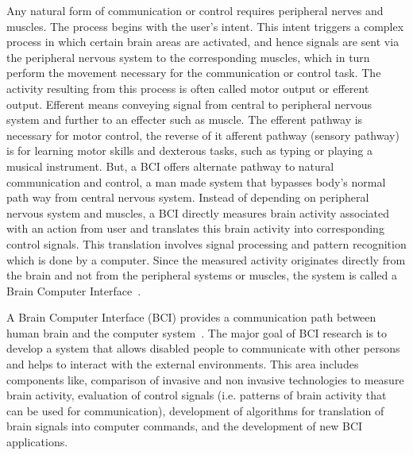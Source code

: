 Any natural form of communication or control requires peripheral nerves and muscles. The process begins with the user's intent. This intent triggers a complex process in which certain brain areas are activated, and hence signals are sent via the peripheral nervous system to the corresponding muscles, which in turn perform the movement necessary for the communication or control task. The activity resulting from this process is often called motor output or efferent output. Efferent means conveying signal from central to peripheral nervous system and further to an effecter such as muscle. The efferent pathway is necessary for motor control, the reverse of it afferent pathway (sensory pathway) is for learning motor skills and dexterous tasks, such as typing or playing a musical instrument. But, a BCI offers alternate pathway to natural communication and control, a man made system that bypasses body's normal path way from central nervous system. Instead of depending on peripheral nervous system and muscles, a BCI directly measures brain activity associated with an action from user and translates this brain activity into corresponding control signals. This translation involves signal processing and pattern recognition which is done by a computer. Since the measured activity originates directly from the brain and not from the peripheral systems or muscles, the system is called a Brain Computer Interface~\cite{2}. 

A Brain Computer Interface (BCI) provides a communication path between human brain and the computer system~\cite{3}. The major goal of BCI research is to develop a system that allows disabled people to communicate with other persons and helps to interact with the external environments. This area includes components like, comparison of invasive and non invasive technologies to measure brain activity, evaluation of control signals (i.e. patterns of brain activity that can be used for communication), development of algorithms for translation of brain signals into computer commands, and the development of new BCI applications.

